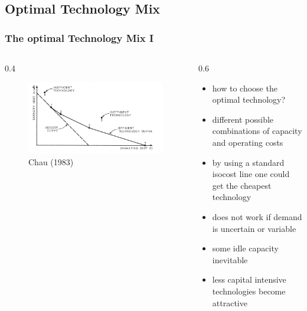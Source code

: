 \subsection{Optimal Technology Mix}

			\begin{frame}

\frametitle{The optimal Technology Mix I}
\begin{columns}
\begin{column} {0.4\textwidth}

\begin{figure}[h]
\centering
\includegraphics[width=1.\textwidth]{capacity/technology_choice_chow}
    \caption{Chau (1983)}
    \label{fig:Daten 2004}            
\end{figure}
\end{column}

\begin{column} {0.6\textwidth}
\begin{itemize}
\item how to choose the optimal technology?
\item different possible combinations of capacity and operating costs
\item by using a standard isocost line one could get the cheapest technology
\item does not work if demand is uncertain or variable
\item some idle capacity inevitable
\item less capital intensive technologies become attractive
\end {itemize}

\end{column}
\end{columns}


			\end{frame}			
